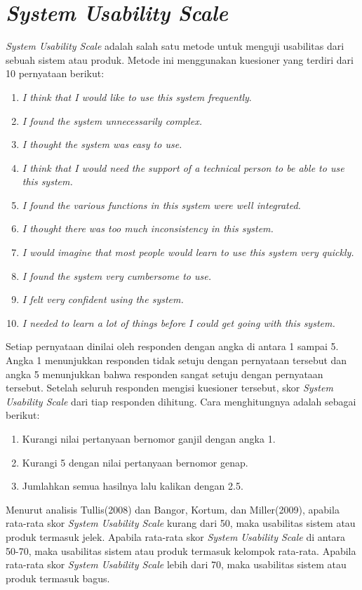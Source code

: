 \section{\textit{System Usability Scale} ~\cite{albert2013measuring}}
\textit{System Usability Scale} adalah salah satu metode untuk menguji usabilitas dari sebuah sistem atau produk. Metode ini menggunakan kuesioner yang terdiri dari 10 pernyataan berikut:
\begin{enumerate}
	\item \textit{I think that I would like to use this system frequently}.
	\item \textit{I found the system unnecessarily complex.}
	\item \textit{I thought the system was easy to use.}
	\item \textit{I think that I would need the support of a technical person to be able to use this system.}
	\item \textit{I found the various functions in this system were well integrated.}
	\item \textit{I thought there was too much inconsistency in this system.}
	\item \textit{I would imagine that most people would learn to use this system very quickly.}
	\item \textit{I found the system very cumbersome to use.}
	\item \textit{I felt very confident using the system.}
	\item \textit{I needed to learn a lot of things before I could get going with this system.}
\end{enumerate}
Setiap pernyataan dinilai oleh responden dengan angka di antara 1 sampai 5. Angka 1 menunjukkan responden tidak setuju dengan pernyataan tersebut dan angka 5 menunjukkan bahwa responden sangat setuju dengan pernyataan tersebut.
Setelah seluruh responden mengisi kuesioner tersebut, skor \textit{System Usability Scale} dari tiap responden dihitung. Cara menghitungnya adalah sebagai berikut:
\begin{enumerate}
	\item Kurangi nilai pertanyaan bernomor ganjil dengan angka 1.
	\item Kurangi 5 dengan nilai pertanyaan bernomor genap.
	\item Jumlahkan semua hasilnya lalu kalikan dengan 2.5.
\end{enumerate}
Menurut analisis Tullis(2008) dan Bangor, Kortum, dan Miller(2009), apabila rata-rata skor \textit{System Usability Scale} kurang dari 50, maka usabilitas sistem atau produk termasuk jelek. Apabila rata-rata skor \textit{System Usability Scale} di antara 50-70, maka usabilitas sistem atau produk termasuk kelompok rata-rata. Apabila rata-rata skor \textit{System Usability Scale} lebih dari 70, maka usabilitas sistem atau produk termasuk bagus. 